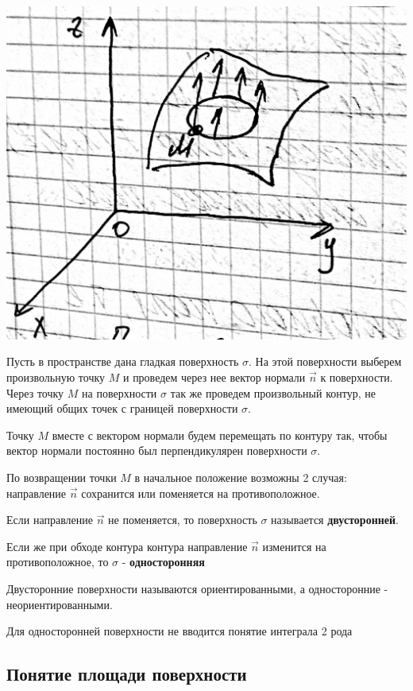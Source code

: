 
\includegraphics[width=\linewidth]{img/3.jpg}

Пусть в пространстве дана гладкая поверхность $\sigma$. На этой поверхности выберем произвольную точку $M$ и проведем через нее вектор нормали $\overrightarrow{n}$ к поверхности. Через точку $M$ на поверхности $\sigma$ так же проведем произвольный контур, не имеющий общих точек с границей поверхности $\sigma$.

Точку $M$ вместе с вектором нормали будем перемещать по контуру так, чтобы вектор нормали постоянно был перпендикулярен поверхности $\sigma$. 

По возвращении точки $M$ в начальное положение возможны 2 случая: направление $\overrightarrow{n}$ сохранится или поменяется на противоположное. 

Если направление $\overrightarrow{n}$ не поменяется, то поверхность $\sigma$ называется \textbf{двусторонней}.

Если же при обходе контура контура направление $\overrightarrow{n}$ изменится на противоположное, то $\sigma$ - \textbf{односторонняя} 

Двусторонние поверхности называются ориентированными, а односторонние - неориентированными.

Для односторонней поверхности не вводится понятие интеграла 2 рода

\subsection{Понятие площади поверхности}

